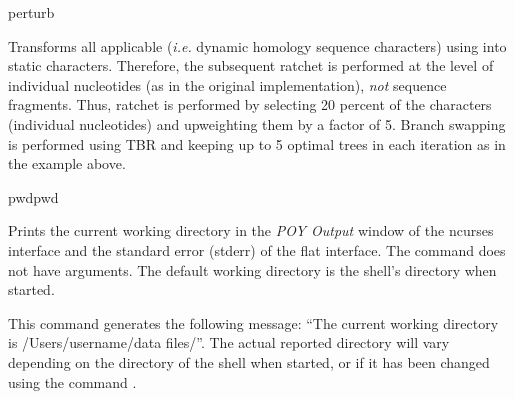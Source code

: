 \begin{command}{perturb}{}
\begin{poyexamples}
            {Transforms all applicable (\emph{i.e.} dynamic homology sequence characters) using
             into static characters. 
            Therefore, the subsequent ratchet is performed at the level of
            individual nucleotides (as in the original implementation), \emph{not}
            sequence fragments. Thus, ratchet is performed by selecting 20 percent of
            the characters (individual nucleotides) and upweighting them by a factor of 5.
            Branch swapping is performed using TBR and keeping up to 5 optimal trees in 
            each iteration as in the example above.}

	\end{poyexamples}
               
	\begin{poyalso}
	\end{poyalso}
	
\end{command}

\begin{command}{pwd}{pwd}

	\syntax{\obligatory{()}}
	
	\begin{poydescription}
         Prints the current working directory in the \emph{POY Output} window of
         the ncurses interface and the standard error (stderr) of the flat interface.
         The command  does not have arguments. The default
         working directory is the shell's directory when \poy started.
	\end{poydescription}
	
	\begin{poyexamples}
		\poyexample{pwd()}
            {This command generates the following message: ``The current
            working directory is /Users/username/data files/''. The actual reported
            directory will vary depending on the directory of the shell when
            \poy started, or if it has been changed using the command
            .}
    \end{poyexamples}

    \begin{poyalso}
    \end{poyalso}

\end{command}

